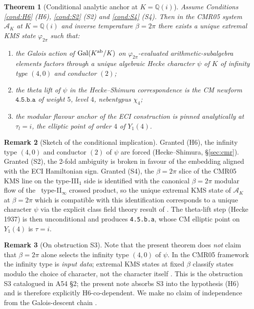\documentclass[12pt]{amsart}
\newtheorem{theorem}{Theorem}[section]
\theoremstyle{definition}
\newtheorem{remark}[theorem]{Remark}
\newcommand{\Q}{\mathbb{Q}}
\newcommand{\Gal}{\mathrm{Gal}}
\newcommand{\DEHK}{\mathrm{DEHK}}
\newcommand{\lmfdb}[1]{\texttt{#1}}
\begin{document}
\begin{theorem}[Conditional analytic anchor at $K = \Q(i)$]
\label{thm:main}
Assume Conditions \ref{cond:H6} (H6), \ref{cond:S2} (S2) and
\ref{cond:S4} (S4). Then in the CMR05 system $\mathcal{A}_K$ at
$K = \Q(i)$ and inverse temperature $\beta = 2\pi$ there exists a
unique extremal KMS state $\varphi_{2\pi}$ such that:
\begin{enumerate}
\item the Galois action of $\Gal(K^{\rm ab}/K)$ on
  $\varphi_{2\pi}$-evaluated arithmetic-subalgebra elements
  factors through a unique algebraic Hecke character $\psi$ of
  $K$ of infinity type $(4,0)$ and conductor $(2)$;
\item the theta lift of $\psi$ in the Hecke--Shimura
  correspondence is the CM newform $\lmfdb{4.5.b.a}$ of weight
  $5$, level $4$, nebentypus $\chi_4$;
\item the modular flavour anchor of the ECI construction is
  pinned analytically at $\tau_l = i$, the elliptic point of order
  $4$ of $Y_1(4)$.
\end{enumerate}
\end{theorem}

\begin{remark}[Sketch of the conditional implication]
Granted (H6), the infinity type $(4, 0)$ and conductor $(2)$ of
$\psi$ are forced (Hecke--Shimura, \S\ref{sec:cmr}). Granted (S2),
the 2-fold ambiguity is broken in favour of the embedding aligned
with the ECI Hamiltonian sign. Granted (S4), the
$\beta = 2\pi$ slice of the CMR05 KMS line on the type-III${}_1$
side is identified with the canonical $\beta = 2\pi$ modular flow
of the \DEHK\ type-II${}_\infty$ crossed product, so the unique
extremal KMS state of $\mathcal{A}_K$ at $\beta = 2\pi$ which is
compatible with this identification corresponds to a unique
character $\psi$ via the explicit class field theory result of
\cite[\S 4]{CMR05}. The theta-lift step (Hecke 1937) is then
unconditional and produces \lmfdb{4.5.b.a}, whose CM elliptic
point on $Y_1(4)$ is $\tau = i$.
\end{remark}

\begin{remark}[On obstruction S3]
\label{rem:S3}
Note that the present theorem does \emph{not} claim that
$\beta = 2\pi$ alone selects the infinity type $(4,0)$ of $\psi$.
In the CMR05 framework the infinity type is \emph{input data};
extremal KMS states at fixed $\beta$ classify states modulo the
choice of character, not the character itself
\cite[Thm 1.2 paraphrased]{CMR05}. This is the obstruction S3
catalogued in A54 \S2; the present note absorbs S3 into the
hypothesis (H6) and is therefore explicitly H6-co-dependent. We
make no claim of independence from the Galois-descent chain
\cite{Remondiere-PNT}.
\end{remark}
\end{document}
